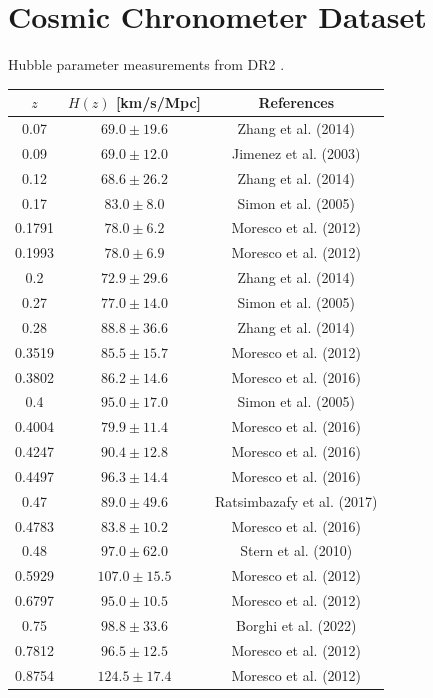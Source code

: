 \documentclass{book}
\begin{document}
	\section{Cosmic Chronometer Dataset}
	Hubble parameter measurements from DR2 \cite{DESI:2025zgx}.
	\begin{table}[h!]
		\centering
		\small
		\begin{tabular}{ccc}
			\hline\hline
			$z$ & $H(z)$ [km/s/Mpc] & References \\ \hline
			0.07 & $69.0 \pm 19.6$ & Zhang et al. (2014) \\
			0.09 & $69.0 \pm 12.0$ & Jimenez et al. (2003) \\
			0.12 & $68.6 \pm 26.2$ & Zhang et al. (2014) \\
			0.17 & $83.0 \pm 8.0$ & Simon et al. (2005) \\
			0.1791 & $78.0 \pm 6.2$ & Moresco et al. (2012) \\
			0.1993 & $78.0 \pm 6.9$ & Moresco et al. (2012) \\
			0.2 & $72.9 \pm 29.6$ & Zhang et al. (2014) \\
			0.27 & $77.0 \pm 14.0$ & Simon et al. (2005) \\
			0.28 & $88.8 \pm 36.6$ & Zhang et al. (2014) \\
			0.3519 & $85.5 \pm 15.7$ & Moresco et al. (2012) \\
			0.3802 & $86.2 \pm 14.6$ & Moresco et al. (2016) \\
			0.4 & $95.0 \pm 17.0$ & Simon et al. (2005) \\
			0.4004 & $79.9 \pm 11.4$ & Moresco et al. (2016) \\
			0.4247 & $90.4 \pm 12.8$ & Moresco et al. (2016) \\
			0.4497 & $96.3 \pm 14.4$ & Moresco et al. (2016) \\
			0.47 & $89.0 \pm 49.6$ & Ratsimbazafy et al. (2017) \\
			0.4783 & $83.8 \pm 10.2$ & Moresco et al. (2016) \\
			0.48 & $97.0 \pm 62.0$ & Stern et al. (2010) \\
			0.5929 & $107.0 \pm 15.5$ & Moresco et al. (2012) \\
			0.6797 & $95.0 \pm 10.5$ & Moresco et al. (2012) \\
			0.75 & $98.8 \pm 33.6$ & Borghi et al. (2022) \\
			0.7812 & $96.5 \pm 12.5$ & Moresco et al. (2012) \\
			0.8754 & $124.5 \pm 17.4$ & Moresco et al. (2012) \\

\end{tabular}
\end{table}
\end{document}
